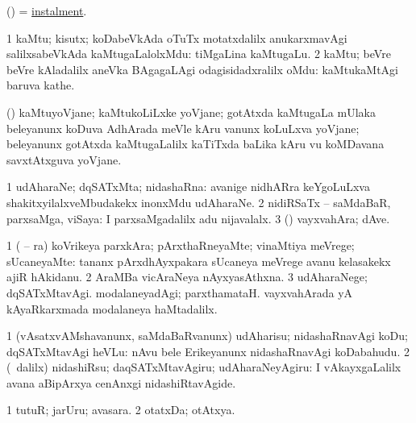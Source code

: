 \bentry
{}
\gl{\nA}
\bmng
(\ame) =  \hyperlink{instalment}{instalment}. 
\emng
\eentry

\bentry
{}
\gl{\nA}
\bmng
\bnum
\num{1} kaMtu; kisutx; koDabeVkAda oTuTx motatxdalilx anukarxmavAgi salilxsabeVkAda kaMtugaLalolxMdu:  tiMgaLina kaMtugaLu. 
\num{2} kaMtu; beVre beVre kAladalilx aneVka BAgagaLAgi odagisidadxralilx oMdu:  kaMtukaMtAgi baruva kathe. 
\enum
\emng
\eentry

\bentry
{}
\gl{\nA}
\bmng
(\ame) kaMtuyoVjane; kaMtukoLiLxke yoVjane; gotAtxda kaMtugaLa mUlaka beleyanunx koDuva AdhArada meVle kAru \mo vanunx koLuLxva yoVjane; beleyanunx gotAtxda kaMtugaLalilx kaTiTxda baLika kAru \mo vu koMDavana savxtAtxguva yoVjane. 
\emng
\eentry

\bentry
{}
\gl{\nA}
\bmng
\bnum
\num{1} udAharaNe; dqSATxMta; nidashaRna:  avanige nidhARra keYgoLuLxva shakitxyilalxveMbudakekx inonxMdu udAharaNe. 
\num{2} nidiRSaTx -- saMdaBaR, parxsaMga, viSaya:  I parxsaMgadalilx adu nijavalalx. 
\num{3} (\nAyxshA) vayxvahAra; dAve. 
\enum
\emng

\noindent
\gl{\pagu}
\bmng
\bnum
\num{1}  ( -- ra) koVrikeya parxkAra; pArxthaRneyaMte; vinaMtiya meVrege; sUcaneyaMte:  tananx pArxdhAyxpakara sUcaneya meVrege avanu kelasakekx ajiR hAkidanu. 
\num{2}  AraMBa vicAraNeya nAyxyasAthxna. 
\num{3}  udAharaNege; dqSATxMtavAgi. 
  
\banum
{} modalaneyadAgi; parxthamataH. 
 vayxvahArada yA kAyaRkarxmada modalaneya haMtadalilx. 
\eanum
\numie
\enum
\emng
\eentry

\bentry
{}
\gl{\sakirx}
\bmng
\bnum
\num{1} (vAsatxvAMshavanunx, saMdaBaRvanunx) udAharisu; nidashaRnavAgi koDu; dqSATxMtavAgi heVLu:  nAvu bele Erikeyanunx nidashaRnavAgi koDabahudu. 
\num{2} (\sA\ \kaparx dalilx) nidashiRsu; daqSATxMtavAgiru; udAharaNeyAgiru:  I vAkayxgaLalilx avana aBipArxya cenAnxgi nidashiRtavAgide. 
\enum
\emng
\eentry

\bentry
{}
\gl{\nA}
\bmng
\bnum
\num{1} tutuR; jarUru; avasara. 
\num{2} otatxDa; otAtxya. 
\enum
\emng
\eentry

